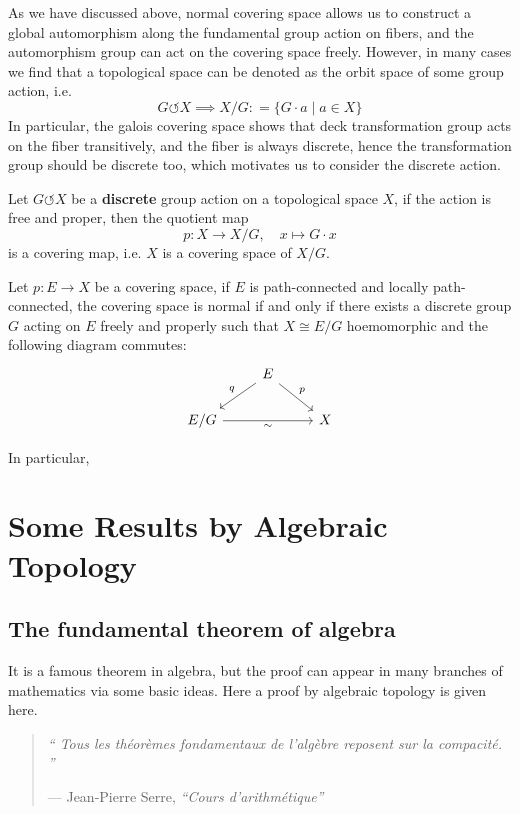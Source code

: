 As we have discussed above, normal covering space allows us to construct a global automorphism along the fundamental group action on fibers, and the automorphism group can act on the covering space freely. However, in many cases we find that a topological space can be denoted as the orbit space of some group action, i.e.
\[G \circlearrowleft X  \implies X/G: = \{G\cdot a \mid a \in X\} \]
In particular, the galois covering space shows that deck transformation group acts on the fiber transitively, and the fiber is always discrete, hence the transformation group should be discrete too, which motivates us to consider the discrete action.

\begin{lemma}
    Let \(G \circlearrowleft X\) be a \textbf{discrete} group action on a topological space \(X\), if the action is free and proper, then the quotient map 
    \[p: X \to X/G, \quad x \mapsto G \cdot x\]
    is a covering map, i.e. \(X\) is a covering space of \(X/G\).
\end{lemma}


\begin{proposition}
    Let \(p:E \to X\) be a covering space, if \(E\) is path-connected and locally path-connected, the covering space is normal if and only if there exists a discrete group \(G\) acting on \(E\) freely and properly such that \(X \cong E/G\) hoemomorphic and the following diagram commutes:
\[\begin{tikzcd}
	& E \\
	{E/G} && X
	\arrow["q"', from=1-2, to=2-1]
	\arrow["p", from=1-2, to=2-3]
	\arrow["\sim"', from=2-1, to=2-3]
\end{tikzcd}\]

    In particular,
\end{proposition}















\newpage

\section{Some Results by Algebraic Topology}
\subsection{The fundamental theorem of algebra}
It is a famous theorem in algebra, but the proof can appear in many branches of mathematics via some basic ideas. Here a proof by algebraic topology is given here.
\begin{quote}
\emph{“ Tous les théorèmes fondamentaux de l'algèbre reposent sur la compacité. ”}

\hfill --- Jean-Pierre Serre, \emph{``Cours d'arithmétique''}

\end{quote}

